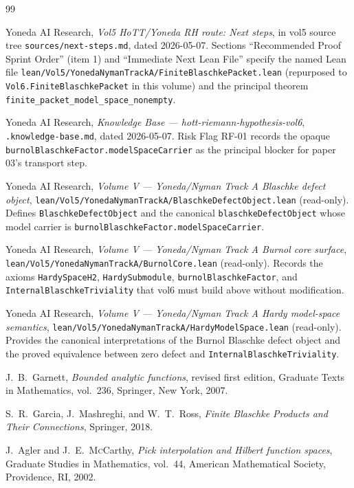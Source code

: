 \documentclass[11pt]{article}
\theoremstyle{plain}
\theoremstyle{definition}
\theoremstyle{remark}
\newcommand{\code}[1]{\texttt{#1}}
\begin{document}
\begin{thebibliography}{99}

Yoneda AI Research,
\emph{Vol5 HoTT/Yoneda RH route: Next steps},
in vol5 source tree
\code{sources/next-steps.md}, dated 2026-05-07.
Sections ``Recommended Proof Sprint Order'' (item 1) and
``Immediate Next Lean File'' specify the named Lean file
\code{lean/Vol5/YonedaNymanTrackA/FiniteBlaschkePacket.lean}
(repurposed to \code{Vol6.FiniteBlaschkePacket} in this volume) and the
principal theorem \code{finite\_packet\_model\_space\_nonempty}.

Yoneda AI Research,
\emph{Knowledge Base --- hott-riemann-hypothesis-vol6},
\code{.knowledge-base.md}, dated 2026-05-07.
Risk Flag RF-01 records the opaque
\code{burnolBlaschkeFactor.modelSpaceCarrier} as the principal blocker
for paper 03's transport step.

Yoneda AI Research,
\emph{Volume V --- Yoneda/Nyman Track A Blaschke defect object},
\code{lean/Vol5/YonedaNymanTrackA/BlaschkeDefectObject.lean}
(read-only).
Defines \code{BlaschkeDefectObject} and the canonical
\code{blaschkeDefectObject} whose model carrier is
\code{burnolBlaschkeFactor.modelSpaceCarrier}.

Yoneda AI Research,
\emph{Volume V --- Yoneda/Nyman Track A Burnol core surface},
\code{lean/Vol5/YonedaNymanTrackA/BurnolCore.lean}
(read-only).
Records the axioms \code{HardySpaceH2}, \code{HardySubmodule},
\code{burnolBlaschkeFactor}, and \code{InternalBlaschkeTriviality} that
vol6 must build above without modification.

Yoneda AI Research,
\emph{Volume V --- Yoneda/Nyman Track A Hardy model-space semantics},
\code{lean/Vol5/YonedaNymanTrackA/HardyModelSpace.lean}
(read-only).
Provides the canonical interpretations of the Burnol Blaschke defect
object and the proved equivalence between zero defect and
\code{InternalBlaschkeTriviality}.

J.~B.~Garnett,
\emph{Bounded analytic functions},
revised first edition,
Graduate Texts in Mathematics, vol.~236,
Springer, New York, 2007.

S.~R.~Garcia, J.~Mashreghi, and W.~T.~Ross,
\emph{Finite Blaschke Products and Their Connections},
Springer, 2018.

J.~Agler and J.~E.~M\textsc{c}Carthy,
\emph{Pick interpolation and Hilbert function spaces},
Graduate Studies in Mathematics, vol.~44,
American Mathematical Society, Providence, RI, 2002.


\end{thebibliography}
\end{document}
